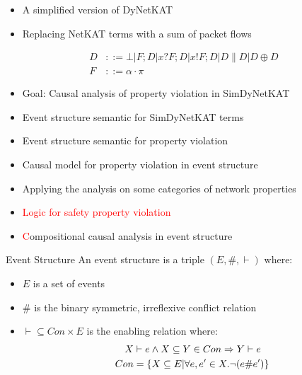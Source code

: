 \begin{frame}
    \begin{itemize}
        \item A simplified version of DyNetKAT
        \item Replacing NetKAT terms with a sum of packet flows
    \end{itemize}
    \begin{align*}
        D & ::= \bot | F;D | x?F;D | x!F;D | D \parallel D
        | D \oplus D                                       \\
        F & ::= \alpha\cdot \pi
    \end{align*}
\end{frame}

\begin{frame}
    \begin{itemize}
        \item Goal: Causal analysis of property violation in SimDyNetKAT
        \item Event structure semantic for SimDyNetKAT terms
        \item Event structure semantic for property violation
        \item Causal model for property violation in event structure
        \item Applying the analysis on some categories of network
              properties
        \item \textcolor{red} {Logic for safety property violation}
        \item \textcolor{red} Compositional causal analysis in
              event structure
    \end{itemize}
\end{frame}

\begin{frame}{Event Structure}
    An event structure is a triple $(E,\#,\vdash)$ where:
    \begin{itemize}
        \item $E$ is a set of events
        \item $\#$ is the binary symmetric, irreflexive conflict relation
        \item $\vdash \subseteq Con \times E$ is the enabling relation where:
              \begin{align*}
                  X   & \vdash e \wedge X \subseteq Y \in Con
                  \Rightarrow Y \vdash e                                      \\
                  Con & = \{X \subseteq E| \forall e,e' \in X. \neg(e \#e')\}
              \end{align*}
    \end{itemize}
\end{frame}

